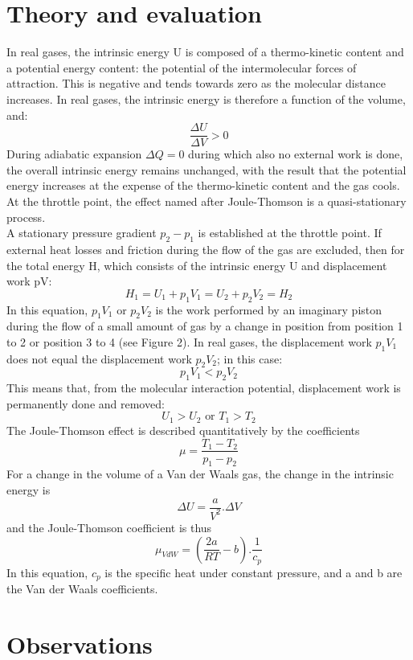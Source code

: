 \documentclass[
	letterpaper, %
	10pt, %
]{CSUniSchoolLabReport}
\begin{document}
\section{Theory and evaluation}
In real gases, the intrinsic energy U is composed of a thermo-kinetic content and a potential energy content: the potential of the intermolecular forces of attraction. This is negative and tends towards zero as the molecular distance increases. In real gases, the intrinsic energy is therefore a function of the volume, and:
\[
	\frac{\Delta U}{\Delta V} > 0
\]
During adiabatic expansion \(\Delta Q = 0\) during which also no external work is done, the overall intrinsic energy remains unchanged, with the result that the potential energy increases at the expense of the  thermo-kinetic content and the gas cools.\\
At the throttle point, the effect named after Joule-Thomson is a quasi-stationary process.\\
A stationary pressure gradient \(p_2 - p_1\)  is established at the throttle point. If external heat losses and friction during the flow of the gas are excluded, then for the total energy H, which consists of the intrinsic energy U and displacement work pV:
\[
	H_1 = U_1 + p_{1}V_1 = U_2 + p_2 V_2 = H_2
\]
In this equation, \(p_{1}V_{1}\) or \(p_{2}V_2\) is the work performed by an
imaginary piston during the flow of a small amount of gas by a change in position from position 1 to 2 or position 3 to 4 (see Figure 2). In real gases, the displacement work \(p_{1}V_1 \)  does not equal the displacement work \(p_2V_2\); in this case:
\[
	p_{1}V_1 < p_2 V_2 
\]
This means that, from the molecular interaction potential, displacement work is permanently done and removed:
\[
	U_1>U_2 \text{ or } T_1 > T_2
\]
The Joule-Thomson effect is described quantitatively by the coefficients 
\[
	\mu = \frac{T_1 - T_2}{p_1 - p_2}
\]
For a change in the volume of a Van der Waals gas, the change in the intrinsic energy is 
\[
	\Delta U = \frac{a}{V^2} . \Delta V
\]
and the Joule-Thomson coefficient is thus 
\[
	\boxed{\mu_{VdW} = \left(\frac{2a}{RT} - b\right). \frac{1}{c_p}}
\]
In this equation, \(c_p\)  is the specific heat under constant pressure, and a and b are the Van der Waals coefficients.
\section{Observations}
\end{document}
